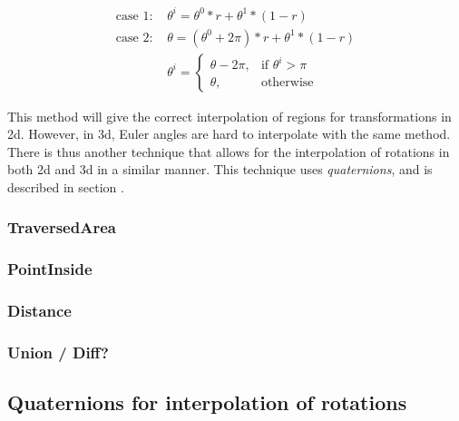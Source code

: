 		\begin{equation}
		\begin{split}
			\text{case } 1: \, & \theta^i = \theta^0 * r + \theta^1 * (1-r) \\
			\text{case } 2: \, & \theta = (\theta^0 + 2\pi) * r + \theta^1 * (1-r) \\
						   	    & \theta^i = 
									\begin{cases}
										\theta - 2\pi, & \text{if } \theta^i > \pi\\
										\theta,         & \text{otherwise}
									\end{cases}
		\end{split}
		\end{equation}

		This method will give the correct interpolation of regions for transformations in 2d. However, in 3d, Euler angles are hard to interpolate with the same method. There is thus another technique that allows for the interpolation of rotations in both 2d and 3d in a similar manner. This technique uses \textit{quaternions}, and is described in section .
		
		\subsubsection{TraversedArea}
		\label{section:traversed_area}
		
		
		\subsubsection{PointInside}
		
		
		\subsubsection{Distance}
		
		
		\subsubsection{Union / Diff?}
		
			
	\subsection{Quaternions for interpolation of rotations}
	
